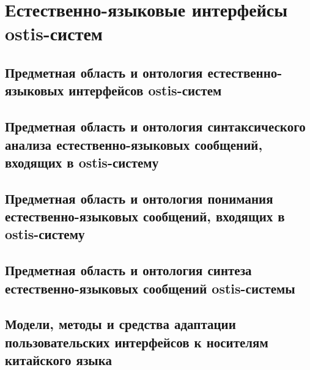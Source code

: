 \chapter{Естественно-языковые интерфейсы ostis-систем}
\label{chapter_nl_interfaces}


\section{Предметная область и онтология естественно-языковых интерфейсов ostis-систем}
\section{Предметная область и онтология синтаксического анализа естественно-языковых сообщений, входящих в ostis-систему}
\section{Предметная область и онтология понимания естественно-языковых сообщений, входящих в ostis-систему}
\section{Предметная область и онтология синтеза естественно-языковых сообщений ostis-системы}
\section{Модели, методы и средства адаптации пользовательских интерфейсов к носителям китайского языка}
\label{section_chinese_interfaces}

%